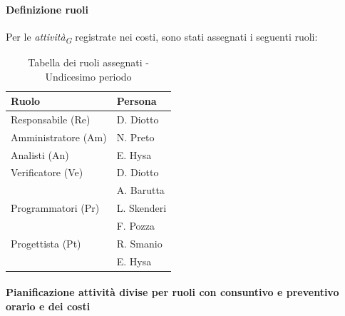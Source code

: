 \paragraph{Definizione ruoli}
Per le \textit{attività}\textsubscript{\textit{G}} registrate nei costi, sono stati assegnati i seguenti ruoli: 

\begin{table}[H]
    \centering
    \begin{tabular}{|L{4cm}|L{2cm}|}
        \hline
        \textbf{Ruolo} & \textbf{Persona} \\
        \hline
        \hline
        Responsabile (Re)   & D. Diotto \\
        \hline
        Amministratore (Am) & N. Preto \\
        \hline
        Analisti (An)       & E. Hysa \\
        \hline
        Verificatore (Ve)   & D. Diotto \\
                            & A. Barutta \\ 
        \hline
        Programmatori (Pr)  & L. Skenderi \\
                            & F. Pozza \\
        \hline
        Progettista (Pt)    & R. Smanio \\
                            & E. Hysa \\
        \hline
    \end{tabular}
    \caption{Tabella dei ruoli assegnati - Undicesimo periodo}
    \label{tab:Ruoli_persone_11}
\end{table}

\paragraph{Pianificazione attività divise per ruoli con consuntivo e preventivo orario e dei costi}

\vspace{0.4cm}

